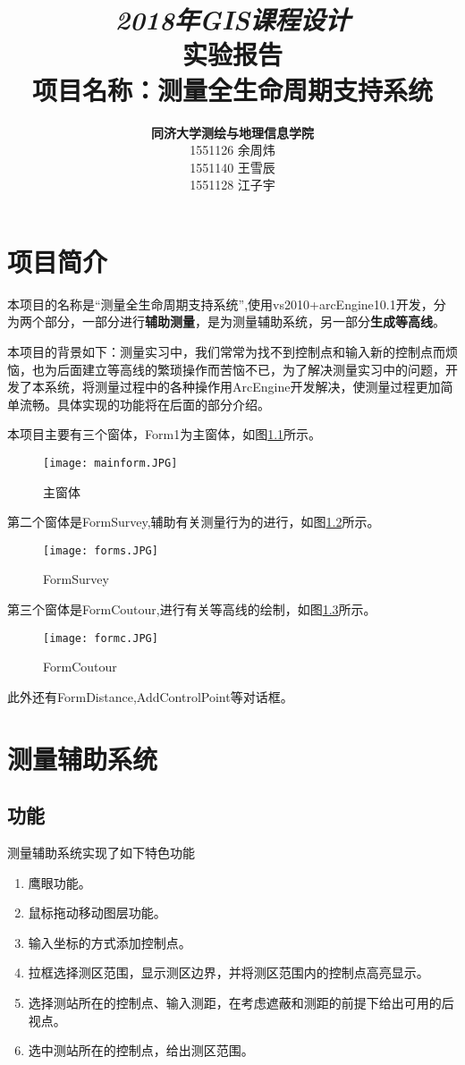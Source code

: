 \documentclass[twoside,color=blue,mathpazo,titlestyle=hang,12pt]{elegantbook}
\title{{\Huge\emph{2018年GIS课程设计}\\实验报告}\\{\Large 项目名称：测量全生命周期支持系统}}
\author
{
\Large\textbf{同济大学测绘与地理信息学院} \\
1551126 余周炜 \\
1551140 王雪辰 \\
1551128 江子宇
}
\date{}
\numberwithin{equation}{section}
\begin{document}
\frontmatter

\maketitle


\tableofcontents

\mainmatter

\chapter{项目简介}

本项目的名称是“测量全生命周期支持系统”,使用vs2010+arcEngine10.1开发，分为两个部分，一部分进行\textbf{辅助测量}，是为测量辅助系统，另一部分\textbf{生成等高线}。

本项目的背景如下：测量实习中，我们常常为找不到控制点和输入新的控制点而烦恼，也为后面建立等高线的繁琐操作而苦恼不已，为了解决测量实习中的问题，开发了本系统，将测量过程中的各种操作用ArcEngine开发解决，使测量过程更加简单流畅。具体实现的功能将在后面的部分介绍。


本项目主要有三个窗体，Form1为主窗体，如图\ref{fig:mainform}所示。
\begin{figure}[htbp]
\caption{主窗体}
\label{fig:mainform}
\centering
\texttt{[image: mainform.JPG]}
\end{figure}

第二个窗体是FormSurvey,辅助有关测量行为的进行，如图\ref{fig:forms}所示。
\begin{figure}[htbp]
\caption{FormSurvey}
\label{fig:forms}
\centering
\texttt{[image: forms.JPG]}
\end{figure}

第三个窗体是FormCoutour,进行有关等高线的绘制，如图\ref{fig:formc}所示。
\begin{figure}[htbp]
\caption{FormCoutour}
\label{fig:formc}
\centering
\texttt{[image: formc.JPG]}
\end{figure}

此外还有FormDistance,AddControlPoint等对话框。

\chapter{测量辅助系统}


\section{功能}
测量辅助系统实现了如下特色功能
\begin{enumerate}   
\item 鹰眼功能。
\item 鼠标拖动移动图层功能。
\item 输入坐标的方式添加控制点。
\item 拉框选择测区范围，显示测区边界，并将测区范围内的控制点高亮显示。
\item 选择测站所在的控制点、输入测距，在考虑遮蔽和测距的前提下给出可用的后视点。
\item 选中测站所在的控制点，给出测区范围。
\end{enumerate}
\end{document}
